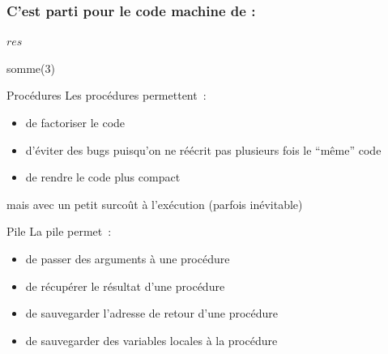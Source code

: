 \documentclass{beamer}
\begin{document}
\begin{frame}
\frametitle{C'est parti pour le code machine de :}

\begin{algorithmic}[1]
\EndWhile
\State \Return $res$
\EndFunction

\State somme($3$)
\EndFunction
\end{algorithmic}

\end{frame}


\begin{frame}
\begin{block}{Procédures}
Les procédures permettent~:
\begin{itemize}
\item de factoriser le code
\item d'éviter des bugs puisqu'on ne réécrit pas plusieurs fois le ``même'' code
\item de rendre le code plus compact 
\end{itemize}
 mais avec un petit surcoût à l'exécution (parfois inévitable)
\end{block}
\begin{block}{Pile}
La pile permet~:
\begin{itemize}
\item de passer des arguments à une procédure
\item de récupérer le résultat d'une procédure
\item de sauvegarder l'adresse de retour d'une procédure
\item de sauvegarder des variables locales à la procédure
\end{itemize}
\end{block}
\end{frame}
\end{document}
